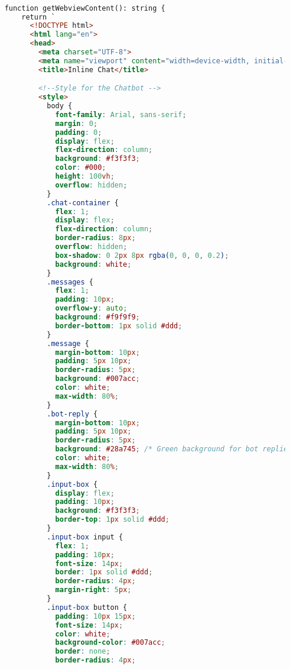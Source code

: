 \begin{lstlisting}[language=HTML, caption={IDE Chat GUI}]

    function getWebviewContent(): string {
        return `
          <!DOCTYPE html>
          <html lang="en">
          <head>
            <meta charset="UTF-8">
            <meta name="viewport" content="width=device-width, initial-scale=1.0">
            <title>Inline Chat</title>

            <!--Style for the Chatbot -->
            <style>
              body {
                font-family: Arial, sans-serif;
                margin: 0;
                padding: 0;
                display: flex;
                flex-direction: column;
                background: #f3f3f3;
                color: #000;
                height: 100vh;
                overflow: hidden;
              }
              .chat-container {
                flex: 1;
                display: flex;
                flex-direction: column;
                border-radius: 8px;
                overflow: hidden;
                box-shadow: 0 2px 8px rgba(0, 0, 0, 0.2);
                background: white;
              }
              .messages {
                flex: 1;
                padding: 10px;
                overflow-y: auto;
                background: #f9f9f9;
                border-bottom: 1px solid #ddd;
              }
              .message {
                margin-bottom: 10px;
                padding: 5px 10px;
                border-radius: 5px;
                background: #007acc;
                color: white;
                max-width: 80%;
              }
              .bot-reply {
                margin-bottom: 10px;
                padding: 5px 10px;
                border-radius: 5px;
                background: #28a745; /* Green background for bot replies */
                color: white;
                max-width: 80%;
              }
              .input-box {
                display: flex;
                padding: 10px;
                background: #f3f3f3;
                border-top: 1px solid #ddd;
              }
              .input-box input {
                flex: 1;
                padding: 10px;
                font-size: 14px;
                border: 1px solid #ddd;
                border-radius: 4px;
                margin-right: 5px;
              }
              .input-box button {
                padding: 10px 15px;
                font-size: 14px;
                color: white;
                background-color: #007acc;
                border: none;
                border-radius: 4px;

\end{lstlisting}
